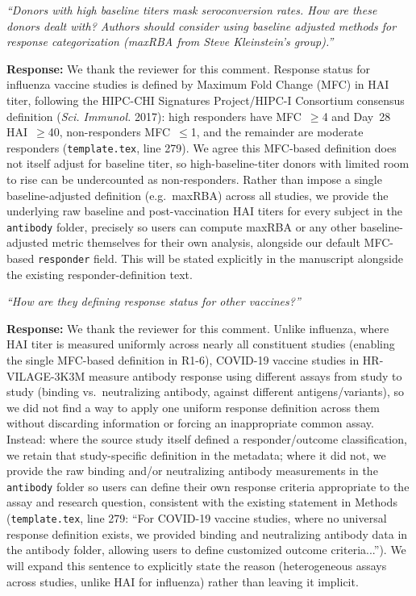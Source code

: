 \documentclass[11pt]{article}
\newcommand{\origcomment}[1]{\textit{``#1''}}
\newcommand{\filledresponse}[1]{%
  \par\medskip\noindent\textbf{Response:} #1\par
  \vspace{0.4cm}%
  \par\noindent\hrulefill\par\bigskip
}
\begin{document}
\begin{commentlist}
\item[R1-6.] \origcomment{Donors with high baseline titers mask seroconversion rates. How are
these donors dealt with? Authors should consider using baseline adjusted methods for response
categorization (maxRBA from Steve Kleinstein's group).}
\filledresponse{We thank the reviewer for this comment. Response status for influenza vaccine studies is defined by Maximum Fold Change
(MFC) in HAI titer, following the HIPC-CHI Signatures Project/HIPC-I Consortium consensus definition (\textit{Sci.
Immunol.} 2017): high
responders have MFC~$\geq$4 and Day~28 HAI~$\geq$40, non-responders MFC~$\leq$1, and the remainder
are moderate responders (\texttt{template.tex}, line 279). We agree this MFC-based definition does
not itself adjust for baseline titer, so high-baseline-titer donors with limited room to rise can be
undercounted as non-responders. Rather than impose a single baseline-adjusted definition (e.g.\
maxRBA) across all studies, we provide the underlying raw baseline and post-vaccination HAI titers
for every subject in the \texttt{antibody} folder, precisely so users can compute maxRBA or any
other baseline-adjusted metric themselves for their own analysis, alongside our default MFC-based
\texttt{responder} field. This will be stated explicitly in the manuscript alongside the existing
responder-definition text.}

\item[R1-7.] \origcomment{How are they defining response status for other vaccines?}
\filledresponse{We thank the reviewer for this comment. Unlike influenza, where HAI titer is measured uniformly across nearly all
constituent studies (enabling the single MFC-based definition in R1-6), COVID-19 vaccine studies in
HR-VILAGE-3K3M measure antibody response using different assays from study to study (binding vs.\
neutralizing antibody, against different antigens/variants), so we did not find a way to apply one
uniform response definition across them without discarding information or forcing an inappropriate
common assay. Instead: where the source study itself defined a responder/outcome classification, we
retain that study-specific definition in the metadata; where it did not, we provide the raw binding
and/or neutralizing antibody measurements in the \texttt{antibody} folder so users can define their
own response criteria appropriate to the assay and research question, consistent with the existing
statement in Methods (\texttt{template.tex}, line 279: ``For COVID-19 vaccine studies, where no
universal response definition exists, we provided binding and neutralizing antibody data in the
antibody folder, allowing users to define customized outcome criteria...''). We will expand this
sentence to explicitly state the reason (heterogeneous assays across studies, unlike HAI for
influenza) rather than leaving it implicit.}


\end{commentlist}
\end{document}
